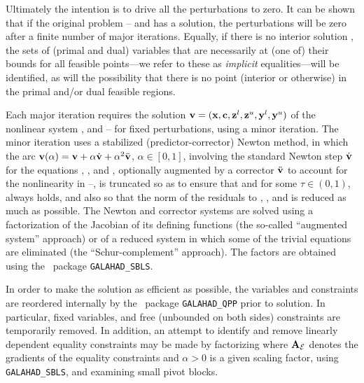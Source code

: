 \documentclass{galahad}
\begin{document}
Ultimately the intention is to drive all the perturbations to zero. 
It can be shown that if the original problem --
and 
has a solution, the perturbations will be zero after a finite number of major 
iterations. Equally, if there is no interior solution  , 
the sets of (primal and dual) variables that are necessarily at (one of) their
bounds for all feasible points---we refer to these as {\em implicit} 
equalities---will be identified, as will the possibility that there is
no point (interior or otherwise) in the primal and/or dual feasible regions.

Each major iteration requires the solution 
${\mathbf{v}} = ({\mathbf{x}},{\mathbf{c}},{\mathbf{z}}^l,{\mathbf{z}}^u,{\mathbf{y}}^l,{\mathbf{y}}^u)$
of the nonlinear system
,  and --
for fixed perturbations, using a minor iteration. The minor iteration
uses a stabilized (predictor-corrector) Newton method, 
in which the arc 
${\mathbf{v}}(\alpha) = {\mathbf{v}} + \alpha \dot{{\mathbf{v}}} + \alpha^2 \ddot{{\mathbf{v}}}$, $\alpha \in 
[0,1]$,
involving the standard Newton step $\dot{{\mathbf{v}}}$
for the equations , , 
and , optionally augmented by a corrector $\ddot{{\mathbf{v}}}$
to account for the nonlinearity in --,
is truncated so as to ensure that
and 
for some $\tau \in (0,1)$, always holds, and also so that the norm
of the residuals to 
, ,  and 
is reduced as much as possible. 
The Newton and corrector systems are solved using a factorization of
the Jacobian of its defining functions (the so-called ``augmented system''
approach) or of a reduced system in which some of the trivial equations are
eliminated (the ``Schur-complement'' approach).
The factors are obtained using the \galahad\ package {\tt GALAHAD\_SBLS}.

In order to make the solution as efficient as possible, the 
variables and constraints are reordered internally
by the \galahad\ package {\tt GALAHAD\_QPP} prior to solution. 
In particular, fixed variables, and 
free (unbounded on both sides) constraints are temporarily removed.
In addition, an attempt to identify and remove linearly dependent
equality constraints may be made by factorizing
where $\bmA_{\cal E}$  denotes the gradients of the equality constraints and
$\alpha > 0$ is a given scaling factor,
using {\tt GALAHAD\_SBLS}, and examining small pivot blocks.
\end{document}
